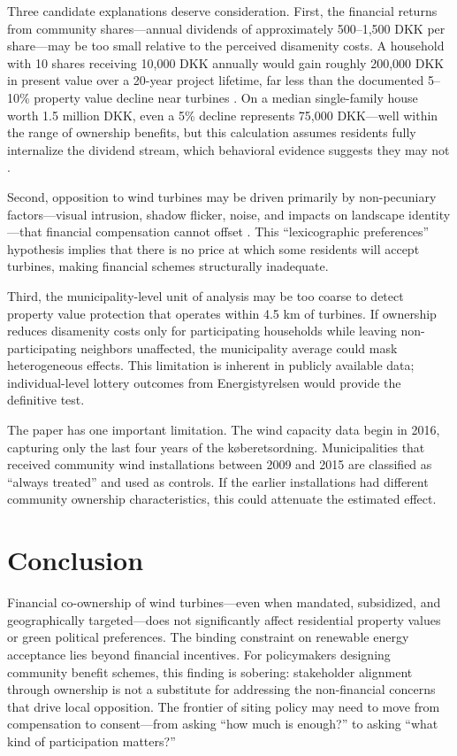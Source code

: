 \documentclass[12pt]{article}
\begin{document}
Three candidate explanations deserve consideration. First, the financial returns from community shares---annual dividends of approximately 500--1,500 DKK per share---may be too small relative to the perceived disamenity costs. A household with 10 shares receiving 10,000 DKK annually would gain roughly 200,000 DKK in present value over a 20-year project lifetime, far less than the documented 5--10\% property value decline near turbines \citep{Hoen2015, GielissenHoen2024}. On a median single-family house worth 1.5 million DKK, even a 5\% decline represents 75,000 DKK---well within the range of ownership benefits, but this calculation assumes residents fully internalize the dividend stream, which behavioral evidence suggests they may not \citep{Thaler1999}.

Second, opposition to wind turbines may be driven primarily by non-pecuniary factors---visual intrusion, shadow flicker, noise, and impacts on landscape identity---that financial compensation cannot offset \citep{DevineWright2009, Wolsink2007}. This ``lexicographic preferences'' hypothesis implies that there is no price at which some residents will accept turbines, making financial schemes structurally inadequate.

Third, the municipality-level unit of analysis may be too coarse to detect property value protection that operates within 4.5 km of turbines. If ownership reduces disamenity costs only for participating households while leaving non-participating neighbors unaffected, the municipality average could mask heterogeneous effects. This limitation is inherent in publicly available data; individual-level lottery outcomes from Energistyrelsen would provide the definitive test.

The paper has one important limitation. The wind capacity data begin in 2016, capturing only the last four years of the k{\o}beretsordning. Municipalities that received community wind installations between 2009 and 2015 are classified as ``always treated'' and used as controls. If the earlier installations had different community ownership characteristics, this could attenuate the estimated effect.


\section{Conclusion}

Financial co-ownership of wind turbines---even when mandated, subsidized, and geographically targeted---does not significantly affect residential property values or green political preferences. The binding constraint on renewable energy acceptance lies beyond financial incentives. For policymakers designing community benefit schemes, this finding is sobering: stakeholder alignment through ownership is not a substitute for addressing the non-financial concerns that drive local opposition. The frontier of siting policy may need to move from compensation to consent---from asking ``how much is enough?'' to asking ``what kind of participation matters?''
\end{document}
